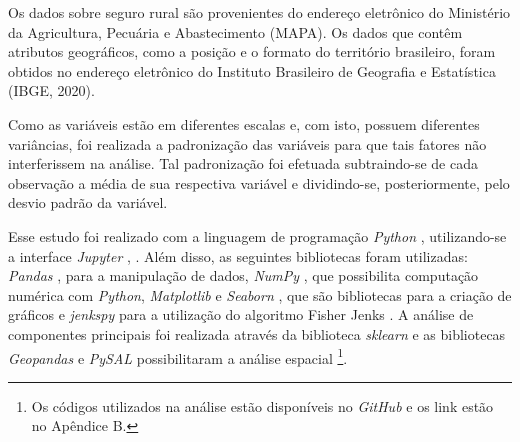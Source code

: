 Os dados sobre seguro rural são provenientes do endereço eletrônico do Ministério da Agricultura, Pecuária e Abastecimento (MAPA). Os dados que contêm atributos geográficos, como a posição e o formato do território brasileiro, foram obtidos no endereço eletrônico do Instituto Brasileiro de Geografia e Estatística (IBGE, 2020).
	
Como as variáveis estão em diferentes escalas e, com isto, possuem diferentes variâncias, foi realizada a padronização das variáveis para que tais fatores não interferissem na análise. Tal padronização foi efetuada subtraindo-se de cada observação a média de sua respectiva variável e dividindo-se, posteriormente, pelo desvio padrão da variável.

Esse estudo foi realizado com a linguagem de programação \textit{Python} \cite{python17_2}, utilizando-se a interface \textit{Jupyter} \cite{jupyter17_2}, \cite{perez07_2} \cite{kluyver19_2}.
Além disso, as seguintes bibliotecas foram utilizadas: 
\textit{Pandas} \cite{mckinney10_2}, para a manipulação de dados,
\textit{NumPy} \cite{walt11_2}, que possibilita computação numérica com \textit{Python},
\textit{Matplotlib} \cite{hunter07_2} e \textit{Seaborn} \cite{waskom14_2}, que são bibliotecas para a criação de gráficos e 
\textit{jenkspy} para a utilização do algoritmo Fisher Jenks \cite{jenks77_2}. 
A análise de componentes principais foi realizada através da biblioteca \textit{sklearn} e as bibliotecas \textit{Geopandas} \cite{jordahl14_2} e \textit{PySAL} \cite{rey07_2} possibilitaram a análise espacial \footnote{Os códigos utilizados na análise estão disponíveis no \textit{GitHub} e os link estão no Apêndice B.}.




